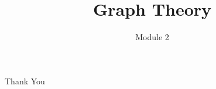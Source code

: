 \documentclass{beamer}
\title{Graph Theory}
\author{Module 2}
\institute{Section 2 : Connectivity}
\begin{document}
\begin{frame}
	\maketitle
\end{frame}

\begin{frame}
	\tableofcontents
\end{frame}

\begin{frame}
	\vspace{0.6in}
	\hspace{3cm} {\color{blue}\Huge{Thank You}}
\end{frame}
\end{document}
